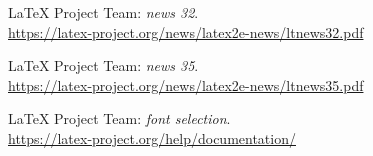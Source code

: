 \documentclass{ltnews}
\providecommand\Dash {\unskip \textemdash}
\begin{document}
\begin{thebibliography}{9}

\fontsize{9.3}{11.3}\selectfont






 \LaTeX{} Project Team:
  \emph{\LaTeXe{} news 32}.\\
  \url{https://latex-project.org/news/latex2e-news/ltnews32.pdf}

 \LaTeX{} Project Team:
  \emph{\LaTeXe{} news 35}.\\
  \url{https://latex-project.org/news/latex2e-news/ltnews35.pdf}

 \LaTeX{} Project Team:
  \emph{\LaTeXe{} font selection}.\\
  \url{https://latex-project.org/help/documentation/}

\end{thebibliography}
\end{document}
